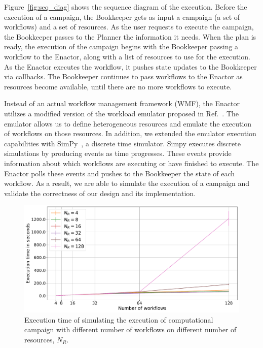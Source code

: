 Figure~\ref{fig:seq_diag} shows the sequence diagram of the execution. Before
the execution of a campaign, the Bookkeeper gets as input a campaign (a set of
workflows) and a set of resources. As the user requests to execute the campaign,
the Bookkeeper passes to the Planner the information it needs. When the plan is
ready, the execution of the campaign begins with the Bookkeeper passing a
workflow to the Enactor, along with a list of resources to use for the
execution. As the Enactor executes the workflow, it pushes state updates to the
Bookkeeper via callbacks. The Bookkeeper continues to pass workflows to the
Enactor as resources become available, until there are no more workflows to execute.

Instead of an actual workflow management framework (WMF), the Enactor utilizes a
modified version of the workload emulator proposed in
Ref.~\cite{balasubramanian2019programming}. The emulator allows us to define
heterogeneous resources and emulate the execution of workflows on those
resources. In addition, we extended the emulator execution capabilities with
SimPy~\cite{simpy}, a discrete time simulator. Simpy executes discrete
simulations by producing events as time progresses. These events provide
information about which workflows are executing or have finished to execute. The
Enactor polls these events and pushes to the Bookkeeper the state of each
workflow. As a result, we are able to simulate the execution of a campaign and
validate the correctness of our design and its implementation.

\begin{figure}[t]
    \centering
    \includegraphics[width=.95\textwidth]{figures/manager/SimTimeWork.pdf}
    \caption{Execution time of simulating the execution of computational campaign with different number of workflows on different number of resources, $N_R$.}
    \label{fig:cm_char}
\end{figure}

